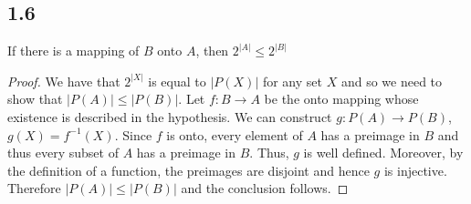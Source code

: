 \subsection*{1.6} If there is a mapping of $B$ onto $A$, then $2^{|A|} \leq 2^{|B|}$

\begin{proof}
We have that $2^{|X|}$ is equal to $|P(X)|$ for any set $X$ and so we need to show that $|P(A)| \leq |P(B)|$. Let $f: B \rightarrow A$ be the onto mapping whose existence is described in the hypothesis. We can construct $g: P(A) \rightarrow P(B)$, $g(X) = f^{-1}(X)$. Since $f$ is onto, every element of $A$ has a preimage in $B$ and thus every subset of $A$ has a preimage in $B$. Thus, $g$ is well defined. Moreover, by the definition of a function, the preimages are disjoint and hence $g$ is injective. Therefore $|P(A)| \leq |P(B)|$ and the conclusion follows.
\end{proof}


